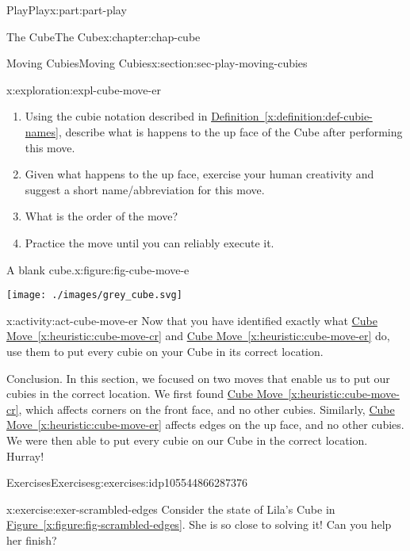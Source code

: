 \documentclass[oneside,10pt,]{book}
\newcommand{\xreffont}{\relax}
\numberwithin{equation}{section}
\begin{document}
\begin{partptx}{Play}{}{Play}{}{}{x:part:part-play}
\begin{chapterptx}{The Cube}{}{The Cube}{}{}{x:chapter:chap-cube}
\begin{sectionptx}{Moving Cubies}{}{Moving Cubies}{}{}{x:section:sec-play-moving-cubies}
\begin{exploration}{}{x:exploration:expl-cube-move-er}
\begin{enumerate}
\item{}Using the cubie notation described in \hyperref[x:definition:def-cubie-names]{Definition~{\xreffont\ref{x:definition:def-cubie-names}}}, describe what is happens to the up face of the Cube after performing this move.%
\item{}Given what happens to the up face, exercise your human creativity and suggest a short name\slash{}abbreviation for this move.%
\item{}What is the order of the move?%
\item{}Practice the move until you can reliably execute it.%
\end{enumerate}
\begin{figureptx}{A blank cube.}{x:figure:fig-cube-move-e}{}%
\begin{image}{0.25}{0.5}{0.25}%
\texttt{[image: ./images/grey\_cube.svg]}
\end{image}%
\tcblower
\end{figureptx}%
\end{exploration}%
\begin{activity}{}{x:activity:act-cube-move-er}%
Now that you have identified exactly what \hyperref[x:heuristic:cube-move-cr]{Cube Move~{\xreffont\ref{x:heuristic:cube-move-cr}}} and \hyperref[x:heuristic:cube-move-er]{Cube Move~{\xreffont\ref{x:heuristic:cube-move-er}}} do, use them to put every cubie on your Cube in its correct location.%
\end{activity}%
\begin{conclusion}{Conclusion.}%
In this section, we focused on two moves that enable us to put our cubies in the correct location. We first found \hyperref[x:heuristic:cube-move-cr]{Cube Move~{\xreffont\ref{x:heuristic:cube-move-cr}}}, which affects corners on the front face, and no other cubies. Similarly, \hyperref[x:heuristic:cube-move-er]{Cube Move~{\xreffont\ref{x:heuristic:cube-move-er}}} affects edges on the up face, and no other cubies. We were then able to put every cubie on our Cube in the correct location. Hurray!%
\end{conclusion}%
%
%
\typeout{************************************************}
\typeout{************************************************}
%
\begin{exercises-subsection-numberless}{Exercises}{}{Exercises}{}{}{g:exercises:idp105544866287376}
\begin{divisionexercise}{1}{}{}{x:exercise:exer-scrambled-edges}%
Consider the state of Lila's Cube in \hyperref[x:figure:fig-scrambled-edges]{Figure~{\xreffont\ref{x:figure:fig-scrambled-edges}}}. She is so close to solving it! Can you help her finish?%

\end{divisionexercise}
\end{exercises-subsection-numberless}
\end{sectionptx}
\end{chapterptx}
\end{partptx}
\end{document}
